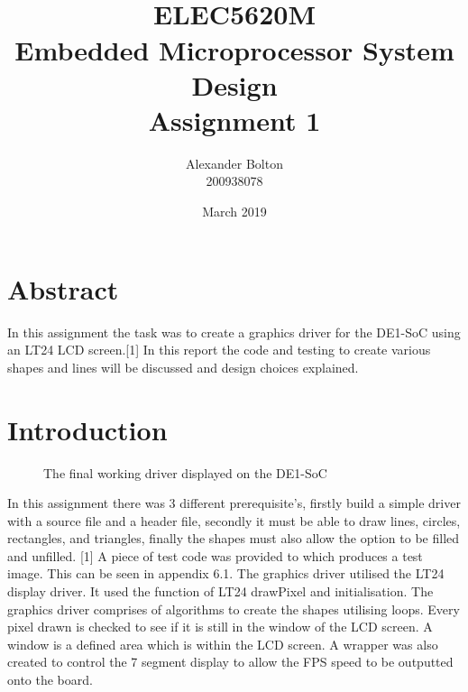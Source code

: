 \documentclass[a4paper,12pt]{article}
\begin{document}
\title{\\ ELEC5620M \\ Embedded Microprocessor System Design \\ Assignment 1}
\author{Alexander Bolton \\ 200938078}
\date{March 2019}
\maketitle
\section{Abstract}
In this assignment the task was to create a graphics driver for the DE1-SoC using an LT24 LCD screen.[1] In this report the code and testing to create various shapes and lines will be discussed and design choices explained.
\newpage

\tableofcontents
\newpage

\section{Introduction}
\begin{figure}[h]
	\centering
	\caption{The final working driver displayed on the DE1-SoC}
\end{figure}

\begin{flushleft}
In this assignment there was 3 different prerequisite's, firstly build a simple driver with a source file and a header file, secondly it must be able to draw lines, circles, rectangles, and triangles, finally the shapes must also allow the option to be filled and unfilled. [1] A piece of test code was provided to which produces a test image. This can be seen in appendix 6.1. 
\newline
\newline
The graphics driver utilised the LT24 display driver. It used the function of LT24 drawPixel and initialisation. The graphics driver comprises of algorithms to create the shapes utilising loops. Every pixel drawn is checked to see if it is still in the window of the LCD screen. A window is a defined area which is within the LCD screen. A wrapper was also created to control the 7 segment display to allow the FPS speed to be outputted onto the board.
\end{flushleft}
\end{document}
